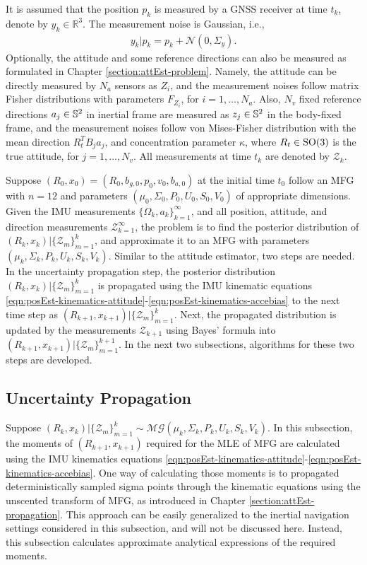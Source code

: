 It is assumed that the position $p_k$ is measured by a GNSS receiver at time $t_k$, denote by $y_k\in\mathbb{R}^3$.
The measurement noise is Gaussian, i.e.,
\begin{align}
	y_k|p_k = p_k + \mathcal{N}(0,\Sigma_y).
\end{align}
Optionally, the attitude and some reference directions can also be measured as formulated in Chapter \ref{section:attEst-problem}.
Namely, the attitude can be directly measured by $N_a$ sensors as $Z_i$, and the measurement noises follow matrix Fisher distributions with parameters $F_{Z_i}$, for $i=1,\ldots,N_a$.
Also, $N_v$ fixed reference directions $a_j\in\mathbb{S}^2$ in inertial frame are measured as $z_j\in\mathbb{S}^2$ in the body-fixed frame, and the measurement noises follow von Mises-Fisher distribution with the mean direction $R_t^TB_ja_j$, and concentration parameter $\kappa$, where $R_t\in\mathrm{SO}(3)$ is the true attitude, for $j = 1,\ldots,N_v$.
All measurements at time $t_k$ are denoted by $\mathcal{Z}_k$.

Suppose $(R_0,x_0) = (R_0,b_{g,0},p_0,v_0,b_{a,0})$ at the initial time $t_0$ follow an MFG with $n=12$ and parameters $(\mu_0,\Sigma_0,P_0,U_0,S_0,V_0)$ of appropriate dimensions.
Given the IMU measurements $\{\Omega_k,a_k\}_{k=1}^\infty$, and all position, attitude, and direction measurements $\mathcal{Z}_{k=1}^\infty$, the problem is to find the posterior distribution of $(R_k,x_k) | \{\mathcal{Z}_m\}_{m=1}^k$, and approximate it to an MFG with parameters $(\mu_k, \Sigma_k, P_k, U_k, S_k, V_k)$.
Similar to the attitude estimator, two steps are needed.
In the uncertainty propagation step, the posterior distribution $(R_k,x_k) | \{\mathcal{Z}_m\}_{m=1}^k$ is propagated using the IMU kinematic equations \eqref{eqn:posEst-kinematics-attitude}-\eqref{eqn:posEst-kinematics-accebias} to the next time step as $(R_{k+1},x_{k+1}) | \{\mathcal{Z}_m\}_{m=1}^k$.
Next, the propagated distribution is updated by the measurements $\mathcal{Z}_{k+1}$ using Bayes' formula into $(R_{k+1},x_{k+1}) | \{\mathcal{Z}_m\}_{m=1}^{k+1}$.
In the next two subsections, algorithms for these two steps are developed.

\subsection{Uncertainty Propagation} \label{section:posEst-propagation}

Suppose $(R_k,x_k) | \{\mathcal{Z}_m\}_{m=1}^k \sim \mathcal{MG}(\mu_k, \Sigma_k, P_k, U_k, S_k, V_k)$.
In this subsection, the moments of $(R_{k+1},x_{k+1})$ required for the MLE of MFG are calculated using the IMU kinematics equations \eqref{eqn:posEst-kinematics-attitude}-\eqref{eqn:posEst-kinematics-accebias}.
One way of calculating those moments is to propagated deterministically sampled sigma points through the kinematic equations using the unscented transform of MFG, as introduced in Chapter \ref{section:attEst-propagation}.
This approach can be easily generalized to the inertial navigation settings considered in this subsection, and will not be discussed here.
Instead, this subsection calculates approximate analytical expressions of the required moments.

